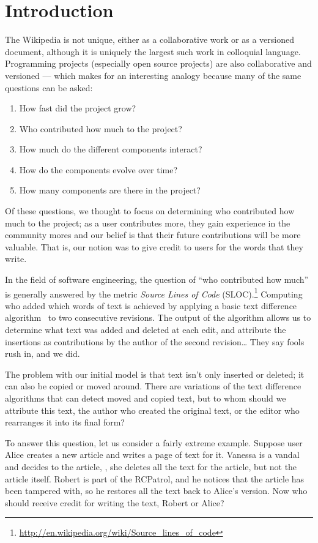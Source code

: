 
\section{Introduction}

The Wikipedia is not unique, either as a collaborative work or as
a versioned document, although it is uniquely the largest such work
in colloquial language.
Programming projects (especially open source projects)
are also collaborative and versioned --- which makes for
an interesting analogy because many of the same questions can be asked:
\begin{enumerate}
\item How fast did the project grow?
\item Who contributed how much to the project?
\item How much do the different components interact?
\item How do the components evolve over time?
\item How many components are there in the project?
\end{enumerate}
Of these questions, we thought to focus on determining who contributed
how much to the project; as a user contributes more, they gain experience
in the community mores and our belief is that their future
contributions will be more valuable.
That is, our notion was to give credit to users for the words that
they write.

In the field of software engineering, the question of ``who contributed
how much'' is generally answered by the metric
\textit{Source Lines of Code} (SLOC).\footnote{\url{http://en.wikipedia.org/wiki/Source_lines_of_code}}
Computing who added which words of text is achieved
by applying a basic text difference
algorithm~\cite{Myers86,TichyEditDist,BurnsLong97} to two consecutive
revisions.
The output of the algorithm allows us to determine what text was added and
deleted at each edit, and attribute the insertions as contributions by the
author of the second revision\ldots\quad
They say fools rush in, and we did.

The problem with our initial model is that text isn't only inserted
or deleted; it can also be copied or moved around.
There are variations of the text difference algorithms that can
detect moved and copied text, but to whom should we attribute this text,
the author who created the original text, or the editor who rearranges it
into its final form?

To answer this question, let us consider a fairly extreme example.
Suppose user Alice creates a new article and writes a page of text for it.
Vanessa is a vandal and decides to  the article,
\ie, she deletes all the text for the article, but not the article itself.
Robert is part of the RCPatrol, and he notices that the article has
been tampered with, so he restores all the text back to Alice's version.
Now who should receive credit for writing the text, Robert or Alice?

